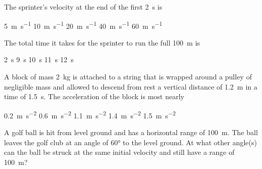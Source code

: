\documentclass{../../../oss-ap12ibhl-print}
\begin{document}
\begin{questions}
  \question The sprinter's velocity at the end of the first \SI{2}{\second} is

  \begin{oneparchoices}
    \choice\SI{5 }{\metre\per\second}\hspace{.27in}
    \choice\SI{10}{\metre\per\second}\hspace{.27in}
    \choice\SI{20}{\metre\per\second}\hspace{.27in}
    \choice\SI{40}{\metre\per\second}\hspace{.27in}
    \choice\SI{60}{\metre\per\second}
  \end{oneparchoices}
  \label{q:sprinter1}
  
  \question The total time it takes for the sprinter to run the full
  \SI{100}{\metre} is
  
  \begin{oneparchoices}
    \choice\SI{2}{\second}\hspace{.5in}
    \choice\SI{9}{\second}\hspace{.5in}
    \choice\SI{10}{\second}\hspace{.5in}
    \choice\SI{11}{\second}\hspace{.5in}
    \choice\SI{12}{\second}
  \end{oneparchoices}
  \label{q:sprinter2}
  
  \uplevel{\rule{\linewidth}{.6pt}}
  
  \question A block of mass \SI{2}{\kilo\gram} is attached to a string that is
  wrapped around a pulley of negligible mass and allowed to descend from rest
  a vertical distance of \SI{1.2}{\metre} in a time of \SI{1.5}{\second}. The
  acceleration of the block is most nearly

  \begin{minipage}{.28\linewidth}
  \end{minipage}
  \begin{minipage}{.3\linewidth}
    \begin{choices}
      \choice\SI{.2}{\metre\per\second\squared}
      \choice\SI{.6}{\metre\per\second\squared}
      \choice\SI{1.1}{\metre\per\second\squared}
      \choice\SI{1.4}{\metre\per\second\squared}
      \choice\SI{1.5}{\metre\per\second\squared}
    \end{choices}
  \end{minipage}
  \newpage
  
  \question A golf ball is hit from level ground and has a horizontal range of
  \SI{100}{\metre}. The ball leaves the golf club at an angle of \ang{60} to
  the level ground. At what other angle(s) can the ball be struck at the same
  initial velocity and still have a range of \SI{100}{\metre}?


\end{questions}
\end{document}
